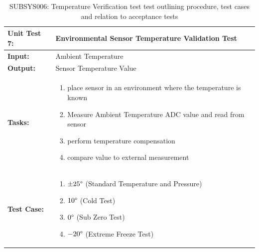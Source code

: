 \begin{table}[H]
    \centering
    \caption{SUBSYS006: Temperature Verification test  test outlining procedure, test cases and relation to acceptance tests}
    \begin{tabular}{|m{}|m{}|}
    \hline
       \textbf{Unit Test 7: }  &  Environmental Sensor Temperature Validation Test\\
       \hline
        \textbf{Input: } &  Ambient Temperature\\
        \hline
        \textbf{Output: } &  Sensor Temperature Value\\
        \hline
        \textbf{Tasks: } & \begin{enumerate}
        \vspace{1mm}
            \item place sensor in an environment where the temperature is known
            \item Measure Ambient Temperature ADC value and read from sensor
            \item perform temperature compensation
            \item compare value to external measurement
        \end{enumerate}\\
        \hline
        \textbf{Test Case: } & \begin{enumerate}
            \vspace{1mm}
            \item $\pm 25\degree$ (Standard Temperature and Pressure)
            \item $10 \degree$ (Cold Test)
            \item $0\degree$ (Sub Zero Test)
            \item $-20 \degree$ (Extreme Freeze Test)
        \end{enumerate}\\
        \hline
    \end{tabular}

    \label{tab:SUBSYS006}
\end{table}

